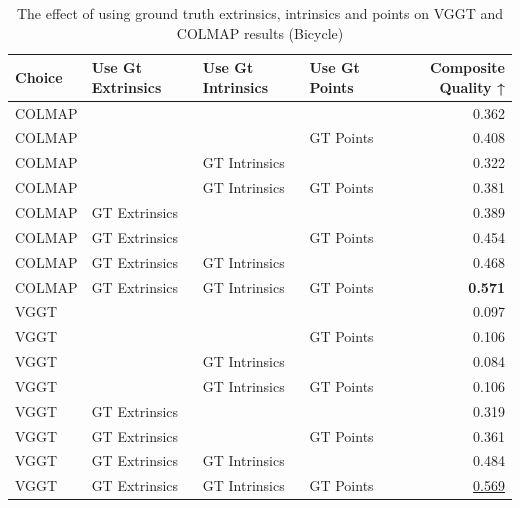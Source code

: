 \begin{table}[H]
\caption{The effect of using ground truth extrinsics, intrinsics and points on VGGT and COLMAP results (Bicycle)}
\label{tab:06_gt_cams_bicycle}
\small
\begin{tabular}{llllr}
\toprule
Choice & Use Gt Extrinsics & Use Gt Intrinsics & Use Gt Points & Composite Quality ↑ \\
\midrule
COLMAP &  &  &  & 0.362 \\
COLMAP &  &  & GT Points & 0.408 \\
COLMAP &  & GT Intrinsics &  & 0.322 \\
COLMAP &  & GT Intrinsics & GT Points & 0.381 \\
COLMAP & GT Extrinsics &  &  & 0.389 \\
COLMAP & GT Extrinsics &  & GT Points & 0.454 \\
COLMAP & GT Extrinsics & GT Intrinsics &  & 0.468 \\
COLMAP & GT Extrinsics & GT Intrinsics & GT Points & \textbf{0.571} \\
VGGT &  &  &  & 0.097 \\
VGGT &  &  & GT Points & 0.106 \\
VGGT &  & GT Intrinsics &  & 0.084 \\
VGGT &  & GT Intrinsics & GT Points & 0.106 \\
VGGT & GT Extrinsics &  &  & 0.319 \\
VGGT & GT Extrinsics &  & GT Points & 0.361 \\
VGGT & GT Extrinsics & GT Intrinsics &  & 0.484 \\
VGGT & GT Extrinsics & GT Intrinsics & GT Points & \underline{0.569} \\
\bottomrule
\end{tabular}
\end{table}
